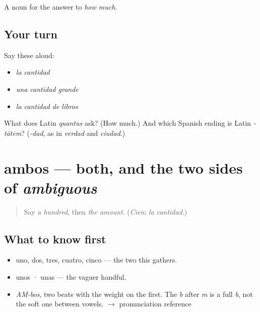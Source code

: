 \begin{grammarlens}[title={What you've built}]
A noun for the answer to \emph{how much}.
\end{grammarlens}

\subsection*{Your turn}
Say these aloud:

\begin{itemize}
\raggedright
  \item \emph{la cantidad}
  \item \emph{una cantidad grande}
  \item \emph{la cantidad de libros}
\end{itemize}

\begin{tcolorbox}[breakable,colback=teal!4,colframe=teal!35!black,title={Before you move on}]
What does Latin \emph{quantus} ask? (How much.) And which Spanish ending is Latin \emph{-tātem}? (\emph{-dad}, as in \emph{verdad} and \emph{ciudad}.)
\end{tcolorbox}
\section[ambos]{ambos — both, and the two sides of \emph{ambiguous}}

\label{lesson:ES-C351-ambos}



\begin{quote}
Say \emph{a hundred}, then \emph{the amount}. (\emph{Cien}; \emph{la cantidad}.)
\end{quote}

\subsection*{What to know first}
\begin{itemize}
\raggedright
  \item uno, dos, tres, cuatro, cinco — the two this gathers.
  \item unos · unas — the vaguer handful.
\end{itemize}

\begin{sounds}
\begin{itemize}
\raggedright
  \item \emph{AM-bos}, two beats with the weight on the first. The \emph{b} after \emph{m} is a full \emph{b}, not the soft one between vowels. $\to$ pronunciation reference
\end{itemize}
\end{sounds}

